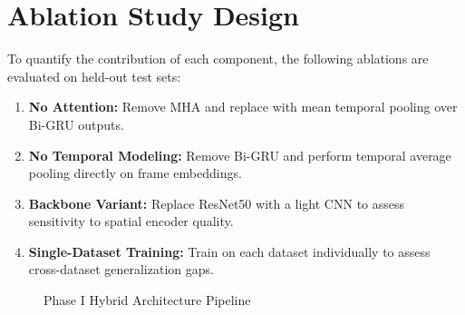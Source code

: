 \section{Ablation Study Design}
To quantify the contribution of each component, the following ablations are evaluated on held-out test sets:
\begin{enumerate}[leftmargin=*]
    \item \textbf{No Attention:} Remove MHA and replace with mean temporal pooling over Bi-GRU outputs.
    \item \textbf{No Temporal Modeling:} Remove Bi-GRU and perform temporal average pooling directly on frame embeddings.
    \item \textbf{Backbone Variant:} Replace ResNet50 with a light CNN to assess sensitivity to spatial encoder quality.
    \item \textbf{Single-Dataset Training:} Train on each dataset individually to assess cross-dataset generalization gaps.
\end{enumerate}

\begin{figure}[!htbp]
\centering
{}%
\caption{Phase I Hybrid Architecture Pipeline}
\label{fig:phase1-arch}
\end{figure}

